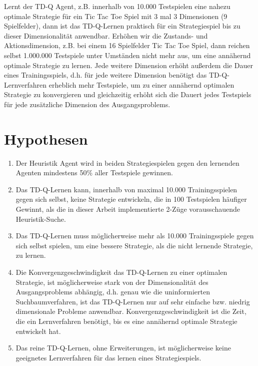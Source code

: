 Lernt der TD-Q Agent, z.B. innerhalb von 10.000 Testspielen eine nahezu optimale Strategie für ein Tic Tac Toe Spiel mit 3 mal 3 Dimensionen (9 Spielfelder), dann ist das TD-Q-Lernen praktisch für ein Strategiespiel bis zu dieser Dimensionalität anwendbar. Erhöhen wir die Zustands- und Aktionsdimension, z.B. bei einem 16 Spielfelder Tic Tac Toe Spiel, dann reichen selbst 1.000.000 Testspiele unter Umständen nicht mehr aus, um eine annähernd optimale Strategie zu lernen. Jede weitere Dimension erhöht außerdem die Dauer eines Trainingsspiels, d.h. für jede weitere Dimension benötigt das TD-Q-Lernverfahren erheblich mehr Testspiele, um zu einer annähernd optimalen Strategie zu konvergieren und gleichzeitig erhöht sich die Dauert jedes Testspiels für jede zusätzliche Dimension des Ausgangsproblems.

\section{Hypothesen}
\label{sec:Hypothese}
\begin{enumerate}
\item Der Heuristik Agent wird in beiden Strategiespielen gegen den lernenden Agenten mindestens 50\% aller Testspiele gewinnen.
\item Das TD-Q-Lernen kann, innerhalb von maximal 10.000 Trainingsspielen gegen sich selbst, keine Strategie entwickeln, die in 100 Testspielen häufiger Gewinnt, als die in dieser Arbeit implementierte 2-Züge vorausschauende Heuristik-Suche.
\item Das TD-Q-Lernen muss möglicherweise mehr als 10.000 Trainingsspiele gegen sich selbst spielen, um eine bessere Strategie, als die nicht lernende Strategie, zu lernen.
\item Die Konvergenzgeschwindigkeit das TD-Q-Lernen zu einer optimalen Strategie, ist möglicherweise stark von der Dimensionalität des Ausgangsproblems abhängig, d.h. genau wie die uninformierten Suchbaumverfahren, ist das TD-Q-Lernen nur auf sehr einfache bzw. niedrig dimensionale Probleme anwendbar. Konvergenzgeschwindigkeit ist die Zeit, die ein Lernverfahren benötigt, bis es eine annähernd optimale Strategie entwickelt hat.
\item Das reine TD-Q-Lernen, ohne Erweiterungen, ist möglicherweise keine geeignetes Lernverfahren für das lernen eines Strategiespiels.  
\end{enumerate}



